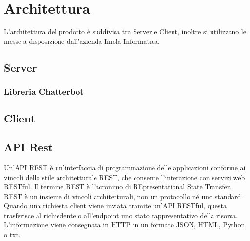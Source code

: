 \section{Architettura}
L'architettura del prodotto è suddivisa tra Server e Client, inoltre si utilizzano le  messe a disposizione dall'azienda Imola Informatica.
\subsection{Server}
\subsubsection{Libreria Chatterbot}
\subsection{Client}
\subsection{API Rest}
Un'API REST è un'interfaccia di programmazione delle applicazioni conforme ai vincoli dello stile architetturale REST, che consente l'interazione con servizi web RESTful.\newline 
Il termine REST è l'acronimo di REpresentational State Transfer. REST è un insieme di vincoli architetturali, non un protocollo né uno standard.
Quando una richiesta client viene inviata tramite un'API RESTful, questa trasferisce al richiedente o all'endpoint uno stato rappresentativo della risorsa. L'informazione viene consegnata in HTTP in un formato JSON, HTML, Python o txt.
\newpage